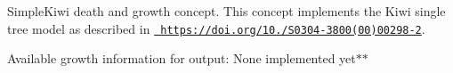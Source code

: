 Simple\+Kiwi death and growth concept. This concept implements the Kiwi single tree model as described in \href{https://doi.org/10.1016/S0304-3800(00)00298-2}{\texttt{ https\+://doi.\+org/10./\+S0304-\/3800(00)00298-\/2}}.

Available growth information for output\+: None implemented yet$\ast$$\ast$ 
